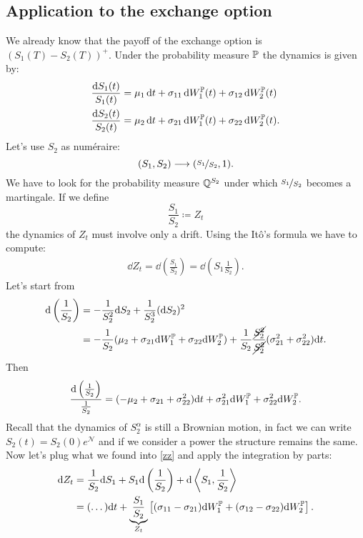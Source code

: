 \subsection{Application to the exchange option}
We already know that the payoff of the exchange option is $(S_1(T)-S_2(T))^+$. Under the probability measure $\mathbb{P}$ the dynamics is given by:
\begin{align}
    \dfrac{\dd S_1(t)}{S_1(t)} &= \mu_1\,\dd t + \sigma_{11}\,\dd W_1^{\mathbb{P}}(t) + \sigma_{12}\,\dd W_2^{\mathbb{P}}(t) \\
    \dfrac{\dd S_2(t)}{S_2(t)} &= \mu_2\,\dd t + \sigma_{21}\,\dd W_1^{\mathbb{P}}(t) + \sigma_{22}\,\dd W_2^{\mathbb{P}}(t).
\end{align}
Let's use $S_2$ as numéraire:
\begin{equation}
    (S_1,S_2)\longrightarrow(\nicefrac{S_1}{S_2}, 1).
\end{equation}
We have to look for the probability measure $\mathbb{Q}^{S_2}$ under which $\nicefrac{S_1}{S_2}$ becomes a martingale. If we define
\begin{equation}
    \frac{S_1}{S_2} \coloneqq Z_t
\end{equation}
the dynamics of $Z_t$ must involve only a drift. Using the Itô's formula we have to compute:
\begin{align}\label{zz}
    \dd Z_t = \dd\left(\frac{S_1}{S_2}\right) = \dd\left(S_1\frac{1}{S_2}\right).
\end{align}
Let's start from
\begin{align*}
    \dd\left(\frac{1}{S_2}\right) &= -\dfrac{1}{S_2^2}\dd S_2 + \dfrac{1}{S^3_2}(\dd S_2)^2 \\
    &=
    -\frac{1}{S_2}(\mu_2 + \sigma_{21}\dd W_1^{\mathbb{P}} + \sigma_{22}\dd W_2^{\mathbb{P}}) + \dfrac{1}{S_2}\dfrac{\cancel{S_2^2}}{\cancel{S_2^2}}(\sigma_{21}^2+ \sigma_{22}^2)\dd t.
\end{align*}
Then
\begin{equation*}
    \frac{\dd\left(\frac{1}{S_2}\right)}{\frac{1}{S_2}} = (-\mu_2 + \sigma_{21} + \sigma_{22}^2)\dd t + \sigma_{21}^2\dd W_1^{\mathbb{P}} + \sigma_{22}^2 \dd W_2^{\mathbb{P}}.
\end{equation*}
Recall that the dynamics of $S_2^{\alpha}$ is still a Brownian motion, in fact we can write $S_2(t) = S_2(0)e^{\mathcal{N}}$ and if we consider a power the structure remains the same. Now let's plug what we found into \eqref{zz} and apply the integration by parts:
\begin{align}
    \notag \dd Z_t &= \dfrac{1}{S_2}\dd S_1 + S_1\dd \left(\frac{1}{S_2}\right) + \dd\expval{S_1,\frac{1}{S_2}} \\
    &=
    \notag (\dots)\dd t + \underbrace{\frac{S_1}{S_2}}_{Z_t}\left[(\sigma_{11}- \sigma_{21})\dd W_1^{\mathbb{P}} + (\sigma_{12}- \sigma_{22})\dd W_2^{\mathbb{P}}\right].
\end{align}
